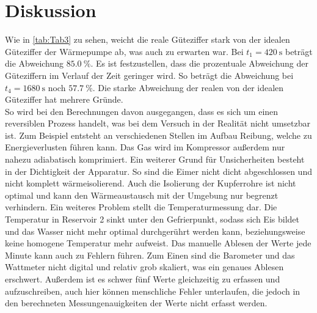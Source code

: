 \section{Diskussion}
\label{sec:Diskussion}

Wie in \autoref{tab:Tab3} zu sehen, weicht die reale Güteziffer stark von der idealen Güteziffer der Wärmepumpe ab, was auch zu erwarten war.
Bei $t_1=\qty{420}{\second}$ beträgt die Abweichung $\qty{85.0}{\percent}$. Es ist festzustellen, dass die prozentuale Abweichung der Güteziffern
im Verlauf der Zeit geringer wird. So beträgt die Abweichung bei $t_4=\qty{1680}{\second}$ noch $\qty{57.7}{\percent}$.
Die starke Abweichung der realen von der idealen Güteziffer hat mehrere Gründe.\\
So wird bei den Berechnungen davon ausgegangen, dass es sich um einen reversiblen Prozess handelt, was bei dem Versuch in der Realität nicht umsetzbar ist.
Zum Beispiel entsteht an verschiedenen Stellen im Aufbau Reibung, welche zu Energieverlusten führen kann.
Das Gas wird im Kompressor außerdem nur nahezu adiabatisch komprimiert.
Ein weiterer Grund für Unsicherheiten besteht in der Dichtigkeit der Apparatur. So sind die Eimer nicht dicht abgeschlossen und nicht komplett wärmeisolierend.
Auch die Isolierung der Kupferrohre ist nicht optimal und kann den Wärmeaustausch mit der Umgebung nur begrenzt verhindern.
Ein weiteres Problem stellt die Temperaturmessung dar. Die Temperatur in Reservoir 2 sinkt unter den Gefrierpunkt, sodass sich Eis bildet und das Wasser
nicht mehr optimal durchgerührt werden kann, beziehungsweise keine homogene Temperatur mehr aufweist.
Das manuelle Ablesen der Werte jede Minute kann auch zu Fehlern führen. Zum Einen sind die Barometer und das Wattmeter nicht digital und relativ grob skaliert, was ein
genaues Ablesen erschwert. Außerdem ist es schwer fünf Werte gleichzeitig zu erfassen und aufzuschreiben, auch hier können menschliche Fehler unterlaufen,
die jedoch in den berechneten Messungenauigkeiten der Werte nicht erfasst werden.


